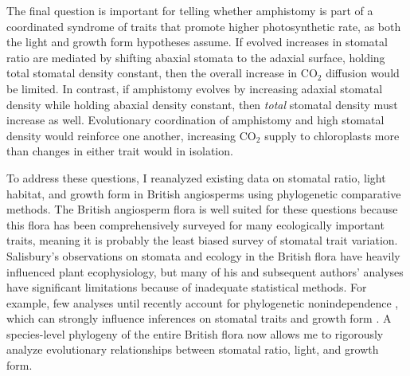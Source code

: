 \documentclass[12pt, oneside]{article}
\begin{document}
The final question is important for telling whether amphistomy is part of a coordinated syndrome of traits that promote higher photosynthetic rate, as both the light and growth form hypotheses assume. If evolved increases in stomatal ratio are mediated by shifting abaxial stomata to the adaxial surface, holding total stomatal density constant, then the overall increase in CO$_2$ diffusion would be limited. In contrast, if amphistomy evolves by increasing adaxial stomatal density while holding abaxial density constant, then \textit{total} stomatal density must increase as well. Evolutionary coordination of amphistomy and high stomatal density would reinforce one another, increasing CO$_2$ supply to chloroplasts more than changes in either trait would in isolation.

To address these questions, I reanalyzed existing data on stomatal ratio, light habitat, and growth form in British angiosperms \citep{Fitter_Peat_1994a, BEF} using phylogenetic comparative methods. The British angiosperm flora is well suited for these questions because this flora has been comprehensively surveyed for many ecologically important traits, meaning it is probably the least biased survey of stomatal trait variation. Salisbury's observations on stomata and ecology in the British flora have heavily influenced plant ecophysiology, but many of his and subsequent authors' analyses have significant limitations because of inadequate statistical methods. For example, few analyses until recently account for phylogenetic nonindependence \citep{Felsenstein_1985}, which can strongly influence inferences on stomatal traits and growth form \citep{Kelly_Beerling_1995}. A species-level phylogeny of the entire British flora \citep{Lim_etal_2014} now allows me to rigorously analyze evolutionary relationships between stomatal ratio, light, and growth form. 



\end{document}
